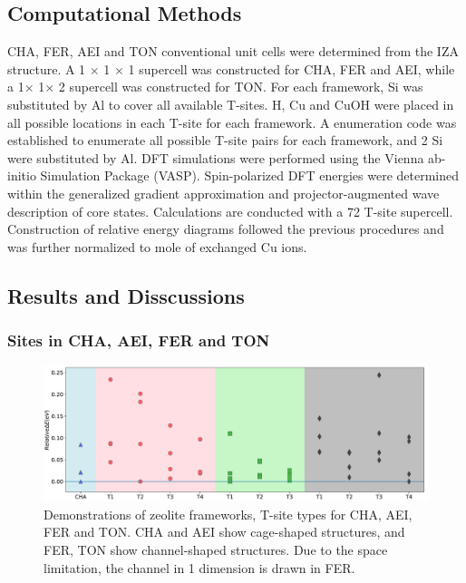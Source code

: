 \documentclass[12pt]{article}
\begin{document}
\subsection*{Computational Methods}

CHA, FER, AEI and TON conventional unit cells were determined from the IZA structure. A 1 $\times$ 1 $\times$ 1 supercell was constructed for CHA, FER and AEI, while a 1$\times$ 1$\times$ 2 supercell was constructed for TON. For each framework, Si was  substituted by Al to cover all available T-sites. H, Cu and CuOH were placed in all possible locations in each T-site for each framework. A enumeration code was established to enumerate all possible T-site pairs for each framework, and 2 Si were substituted by Al. DFT simulations were performed using the Vienna ab-initio Simulation Package (VASP). Spin-polarized DFT energies were determined within the generalized gradient approximation and projector-augmented wave description of core states. Calculations are conducted with a 72 T-site supercell. Construction of relative energy diagrams followed the previous procedures \cite{Paolucci2016} and was further normalized to mole of exchanged Cu ions.


\subsection*{Results and Disscussions}
\subsubsection*{Sites in CHA, AEI, FER and TON}
\begin{figure}[H]
\centering
 \includegraphics[width=5.2in]{./Figures/Figure-1}
 \caption{Demonstrations of zeolite frameworks, T-site types for CHA, AEI, FER and TON. CHA and AEI show cage-shaped structures, and FER, TON show channel-shaped structures. Due to the space limitation, the channel in 1 dimension is drawn in FER.}
 \label{Topologies}
\end{figure}
\end{document}
